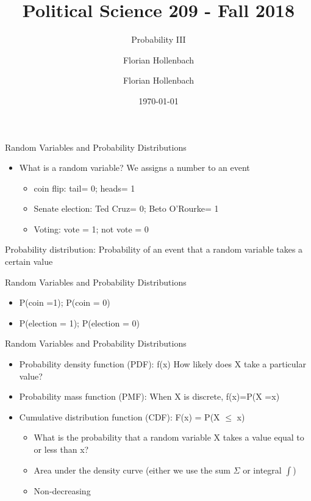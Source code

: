 \documentclass[presentation]{beamer}
\author{Florian Hollenbach}
\author{Florian Hollenbach}
\date{\today}
\title{Political Science 209 - Fall 2018}
\subtitle{Probability III}
\begin{document}
\maketitle


\begin{frame}[label={sec:org6748058}]{Random Variables and Probability Distributions}
\begin{itemize}
\item What is a random variable? We assigns a number to an event
\begin{itemize}
\item coin flip: tail= 0; heads= 1
\item Senate election: Ted Cruz= 0; Beto O'Rourke= 1
\item Voting: vote = 1; not vote = 0
\end{itemize}
\end{itemize}



\pause

Probability distribution: Probability of an event that a random variable takes a certain value
\end{frame}


\begin{frame}[label={sec:orgf99ddca}]{Random Variables and Probability Distributions}
\begin{itemize}
\item P(coin =1); P(coin = 0)
\item P(election = 1); P(election = 0)
\end{itemize}
\end{frame}


\begin{frame}[label={sec:orgc14e668}]{Random Variables and Probability Distributions}
\begin{itemize}
\item \alert{Probability density function (PDF)}: f(x) How likely does X take a particular value?
\item \alert{Probability mass function (PMF)}: When X is discrete, f(x)=P(X =x)
\end{itemize}

\pause

\begin{itemize}
\item \alert{Cumulative distribution function (CDF)}: F(x) = P(X \(\leq\) x)
\begin{itemize}
\item What is the probability that a random variable X takes a value equal to or less than x?
\item Area under the density curve (either we use the sum \(\Sigma\) or integral \(\int\))
\item Non-decreasing
\end{itemize}
\end{itemize}
\end{frame}
\end{document}
